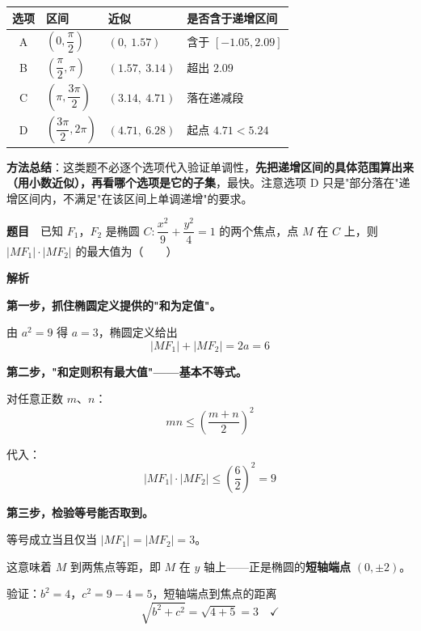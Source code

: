 \begin{center}
\begin{tabular}{clll}
\toprule
选项 & 区间 & 近似 & 是否含于递增区间 \\
\midrule
A & $\left(0,\dfrac\pi2\right)$ & $(0,\ 1.57)$ &  含于 $[-1.05,2.09]$ \\
B & $\left(\dfrac\pi2,\pi\right)$ & $(1.57,\ 3.14)$ &  超出 $2.09$ \\
C & $\left(\pi,\dfrac{3\pi}2\right)$ & $(3.14,\ 4.71)$ &  落在递减段 \\
D & $\left(\dfrac{3\pi}2,2\pi\right)$ & $(4.71,\ 6.28)$ &  起点 $4.71<5.24$ \\
\bottomrule
\end{tabular}
\end{center}


\begin{gktip}
\textbf{方法总结}：这类题不必逐个选项代入验证单调性，\textbf{先把递增区间的具体范围算出来（用小数近似），再看哪个选项是它的子集}，最快。注意选项 D 只是"部分落在"递增区间内，不满足"在该区间上单调递增"的要求。
\end{gktip}

\par\medskip


\textbf{题目}　已知 $F_1$，$F_2$ 是椭圆 $C:\dfrac{x^{2}}9+\dfrac{y^{2}}4=1$ 的两个焦点，点 $M$ 在 $C$ 上，则 $\left|MF_1\right|\cdot\left|MF_2\right|$ 的最大值为（　　）

\textbf{解析}

\textbf{第一步，抓住椭圆定义提供的"和为定值"。}

由 $a^{2}=9$ 得 $a=3$，椭圆定义给出
\[\left|MF_1\right|+\left|MF_2\right|=2a=6\]

\textbf{第二步，"和定则积有最大值"——基本不等式。}

对任意正数 $m$、$n$：
\[mn\le\left(\frac{m+n}2\right)^{2}\]

代入：
\[\left|MF_1\right|\cdot\left|MF_2\right|\le\left(\frac62\right)^{2}=9\]

\textbf{第三步，检验等号能否取到。}

等号成立当且仅当 $\left|MF_1\right|=\left|MF_2\right|=3$。

这意味着 $M$ 到两焦点等距，即 $M$ 在 $y$ 轴上——正是椭圆的\textbf{短轴端点} $(0,\pm2)$。

验证：$b^{2}=4$，$c^{2}=9-4=5$，短轴端点到焦点的距离
\[\sqrt{b^{2}+c^{2}}=\sqrt{4+5}=3\quad\checkmark\]

